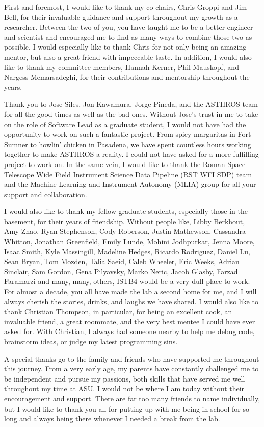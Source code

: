 First and foremost, I would like to thank my co-chairs, Chris Groppi and Jim Bell, for their invaluable guidance and support throughout my growth as a researcher.
Between the two of you, you have taught me to be a better engineer and scientist and encouraged me to find as many ways to combine those two as possible.
I would especially like to thank Chris for not only being an amazing mentor, but also a great friend with impeccable taste. 
In addition, I would also like to thank my committee members, Hannah Kerner, Phil Mauskopf, and Nargess Memarsadeghi, for their contributions and mentorship throughout the years. 

Thank you to Jose Siles, Jon Kawamura, Jorge Pineda, and the ASTHROS team for all the good times as well as the bad ones.
Without Jose's trust in me to take on the role of Software Lead as a graduate student, I would not have had the opportunity to work on such a fantastic project.
From spicy margaritas in Fort Sumner to howlin' chicken in Pasadena, we have spent countless hours working together to make ASTHROS a reality. 
I could not have asked for a more fulfilling project to work on.
In the same vein, I would like to thank the Roman Space Telescope Wide Field Instrument Science Data Pipeline (RST WFI SDP) team and the Machine Learning and Instrument Autonomy (MLIA) group for all your support and collaboration.

I would also like to thank my fellow graduate students, especially those in the basement, for their years of friendship.
Without people like, Libby Berkhout, Amy Zhao, Ryan Stephenson, Cody Roberson, Justin Mathewson, Cassandra Whitton, Jonathan Greenfield, Emily Lunde, Mohini Jodhpurkar, Jenna Moore, Isaac Smith, Kyle Massingill, Madeline Hedges, Ricardo Rodriguez, Daniel Lu, Sean Bryan, Tom Mozden, Talia Saeid, Caleb Wheeler, Eric Weeks, Adrian Sinclair, Sam Gordon, Gena Pilyavsky, Marko Neric, Jacob Glasby, Farzad Faramarzi and many, many, others, ISTB4 would be a very dull place to work. 
For almost a decade, you all have made the lab a second home for me, and I will always cherish the stories, drinks, and laughs we have shared.
I would also like to thank Christian Thompson, in particular, for being an excellent cook, an invaluable friend, a great roommate, and the very best mentee I could have ever asked for.
With Christian, I always had someone nearby to help me debug code, brainstorm ideas, or judge my latest programming sins.

A special thanks go to the family and friends who have supported me throughout this journey. 
From a very early age, my parents have constantly challenged me to be independent and pursue my passions, both skills that have served me well throughout my time at ASU.
I would not be where I am today without their encouragement and support.
There are far too many friends to name individually, but I would like to thank you all for putting up with me being in school for so long and always being there whenever I needed a break from the lab.

